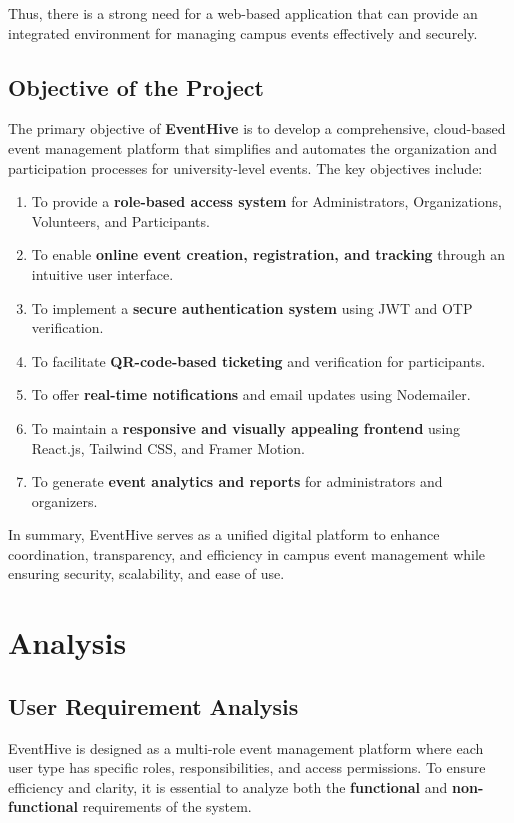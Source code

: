 \documentclass[12pt,a4paper]{report}
\begin{document}
Thus, there is a strong need for a web-based application that can provide an integrated environment for managing campus events effectively and securely.

\section{Objective of the Project}
The primary objective of \textbf{EventHive} is to develop a comprehensive, cloud-based event management platform that simplifies and automates the organization and participation processes for university-level events. The key objectives include:
\begin{enumerate}
    \item To provide a \textbf{role-based access system} for Administrators, Organizations, Volunteers, and Participants.
    \item To enable \textbf{online event creation, registration, and tracking} through an intuitive user interface.
    \item To implement a \textbf{secure authentication system} using JWT and OTP verification.
    \item To facilitate \textbf{QR-code-based ticketing} and verification for participants.
    \item To offer \textbf{real-time notifications} and email updates using Nodemailer.
    \item To maintain a \textbf{responsive and visually appealing frontend} using React.js, Tailwind CSS, and Framer Motion.
    \item To generate \textbf{event analytics and reports} for administrators and organizers.
\end{enumerate}

In summary, EventHive serves as a unified digital platform to enhance coordination, transparency, and efficiency in campus event management while ensuring security, scalability, and ease of use.

\chapter{Analysis}

\section{User Requirement Analysis}

EventHive is designed as a multi-role event management platform where each user type has specific roles, responsibilities, and access permissions. To ensure efficiency and clarity, it is essential to analyze both the \textbf{functional} and \textbf{non-functional} requirements of the system.
\end{document}
